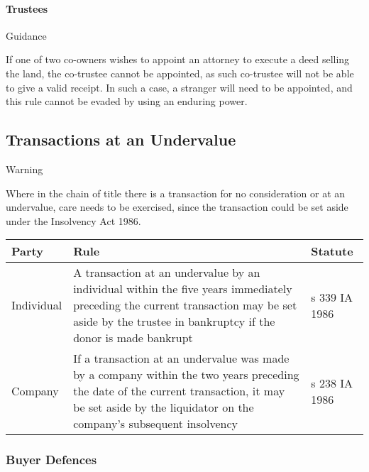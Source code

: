 \documentclass[
]{article}
\newenvironment{env-6551cd31-4c34-4de5-9b70-48dd453ea5fd}
{
    \savenotes\tcolorbox[blanker,breakable,left=5pt,borderline west={2pt}{-4pt}{orange}]
}
{
    \endtcolorbox\spewnotes
}
\newenvironment{env-8d28ec84-dab8-490f-8d30-94b3086ae3c1}
{
    \savenotes\tcolorbox[blanker,breakable,left=5pt,borderline west={2pt}{-4pt}{darkred}]
}
{
    \endtcolorbox\spewnotes
}
\begin{document}
\hypertarget{trustees}{%
\paragraph{Trustees}\label{trustees}}

\begin{env-8d28ec84-dab8-490f-8d30-94b3086ae3c1}

Guidance

If one of two co-owners wishes to appoint an attorney to execute a deed
selling the land, the co-trustee cannot be appointed, as such co-trustee
will not be able to give a valid receipt. In such a case, a stranger
will need to be appointed, and this rule cannot be evaded by using an
enduring power.

\end{env-8d28ec84-dab8-490f-8d30-94b3086ae3c1}

\hypertarget{transactions-at-an-undervalue}{%
\subsection{Transactions at an
Undervalue}\label{transactions-at-an-undervalue}}

\begin{env-6551cd31-4c34-4de5-9b70-48dd453ea5fd}

Warning

Where in the chain of title there is a transaction for no consideration
or at an undervalue, care needs to be exercised, since the transaction
could be set aside under the Insolvency Act 1986.

\end{env-6551cd31-4c34-4de5-9b70-48dd453ea5fd}

\begin{longtable}[]{@{}lll@{}}
\toprule()
Party & Rule & Statute \\
\midrule()
\endhead
Individual & A transaction at an undervalue by an individual within the
five years immediately preceding the current transaction may be set
aside by the trustee in bankruptcy if the donor is made bankrupt & s 339
IA 1986 \\
Company & If a transaction at an undervalue was made by a company within
the two years preceding the date of the current transaction, it may be
set aside by the liquidator on the company's subsequent insolvency & s
238 IA 1986 \\
\bottomrule()
\end{longtable}

\hypertarget{buyer-defences}{%
\subsubsection{Buyer Defences}\label{buyer-defences}}
\end{document}
